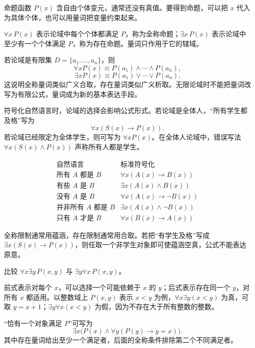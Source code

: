 命题函数 $P(x)$ 含自由个体变元，通常还没有真值。要得到命题，可以把 $x$ 代入为具体个体，也可以用量词把变量约束起来。

\begin{definition}[全称量词与存在量词]\label{ch2-quantifier}
$\forall x\,P(x)$ 表示论域中每个个体都满足 $P$，称为全称命题；$\exists x\,P(x)$ 表示论域中至少有一个个体满足 $P$，称为存在命题。量词只作用于它的辖域。
\end{definition}

若论域是有限集 $D=\{a_1,\ldots,a_n\}$，则
\[
\forall xP(x)\equiv P(a_1)\land\cdots\land P(a_n),
\]
\[
\exists xP(x)\equiv P(a_1)\lor\cdots\lor P(a_n).
\]
这说明全称量词类似广义合取，存在量词类似广义析取。无限论域时不能把量词改写为有限公式，量词成为新的基本表达手段。

符号化自然语言时，论域的选择会影响公式形式。若论域是全体人，“所有学生都及格”写为
\[
\forall x(S(x)\to P(x)).
\]
若论域已经限定为全体学生，则可写为 $\forall xP(x)$。在全体人论域中，错误写法 $\forall x(S(x)\land P(x))$ 声称所有人都是学生。

\[
\begin{array}{c|c}
\text{自然语言} & \text{标准符号化}\\ \hline
\text{所有 }A\text{ 都是 }B & \forall x(A(x)\to B(x))\\
\text{有些 }A\text{ 是 }B & \exists x(A(x)\land B(x))\\
\text{没有 }A\text{ 是 }B & \forall x(A(x)\to\neg B(x))\\
\text{并非所有 }A\text{ 都是 }B & \exists x(A(x)\land\neg B(x))\\
\text{只有 }A\text{ 才是 }B & \forall x(B(x)\to A(x))
\end{array}
\]

全称限制通常用蕴涵，存在限制通常用合取。若把“有学生及格”写成 $\exists x(S(x)\to P(x))$，则任取一个非学生对象即可使蕴涵空真，公式不能表达原意。

\begin{example}[title={量词次序的含义}]\label{ch2-quantifier-order}
比较 $\forall x\exists y\,P(x,y)$ 与 $\exists y\forall x\,P(x,y)$。
\begin{solution}
前式表示对每个 $x$，可以选择一个可能依赖于 $x$ 的 $y$；后式表示存在同一个 $y$，对所有 $x$ 都适用。以整数域上 $P(x,y)$ 表示 $x<y$ 为例，$\forall x\exists y(x<y)$ 为真，可取 $y=x+1$；$\exists y\forall x(x<y)$ 为假，因为不存在大于所有整数的整数。
\end{solution}
\end{example}

\begin{example}[title={唯一性表达}]\label{ch2-unique}
“恰有一个对象满足 $P$”可写为
\[
\exists x\bigl(P(x)\land\forall y(P(y)\to y=x)\bigr).
\]
其中存在量词给出至少一个满足者，后面的全称条件排除第二个不同满足者。
\end{example}

